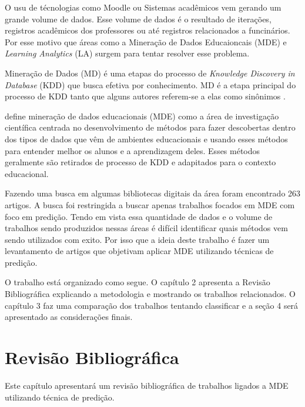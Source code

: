 \documentclass[ti]{texufpel} %
\begin{document}
O usu de técnologias como Moodle ou Sistemas acadêmicos vem gerando um grande volume de dados.
Esse volume de dados é o resultado de iterações, registros acadêmicos dos professores ou até registros relacionados a funcinários.
Por esse motivo que áreas como a Mineração de Dados Educaioncais (MDE) e \textit{Learning Analytics} (LA) surgem para tentar resolver esse problema.

Mineração de Dados (MD) é uma etapas do processo de \textit{Knowledge Discovery in Database} (KDD) que busca efetiva por conhecimento. MD é a etapa principal do processo de KDD tanto que alguns autores referem-se a elas como sinônimos \cite{goldschmidt2015data}.

\citet{baker2010data} define mineração de dados educacionais (MDE) como a área de investigação científica centrada no desenvolvimento de métodos para fazer descobertas dentro dos tipos de dados que vêm de ambientes educacionais e usando esses métodos para entender melhor os alunos e a aprendizagem deles. Esses métodos geralmente são retirados de processo de KDD e adapitados para o contexto educacional.

Fazendo uma busca em algumas bibliotecas digitais da área foram encontrado 263 artigos. A busca foi restringida a buscar apenas trabalhos focados em MDE com foco em predição. Tendo em vista essa quantidade de dados e o volume de trabalhos sendo produzidos nessas áreas é difícil identificar quais métodos vem sendo utilizados com exito. Por isso que a ideia deste trabalho é fazer um levantamento de artigos que objetivam aplicar MDE utilizando técnicas de predição.

O trabalho está organizado como segue. O capítulo 2 apresenta a Revisão Bibliográfica explicando a metodologia e mostrando os trabalhos relacionados. O capítulo 3 faz uma comparação dos trabalhos tentando classificar e a seção 4 será apresentado as considerações finais.

\chapter{Revisão Bibliográfica}
Este capítulo apresentará um revisão bibliográfica de trabalhos ligados a MDE utilizando técnica de predição.
\end{document}
